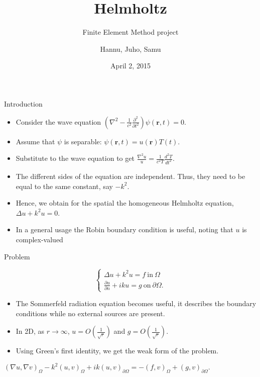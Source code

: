 \documentclass{beamer}
\title[Helmholtz]{Helmholtz}
\subtitle{Finite Element Method project}
\author{Hannu, Juho, Samu}
\date{April 2, 2015}
\begin{document}
\begin{frame}
\titlepage
\end{frame}

\begin{frame}{Introduction}
\begin{itemize}
\item Consider the wave equation $(\nabla^2 - \frac{1}{c^2} \frac{\partial^2}{\partial t^2})\psi(\mathbf{r}, t) = 0$. 
\item Assume that $\psi$ is separable: $\psi(\mathbf{r}, t) = u(\mathbf{r})T(t)$. 
\item Substitute to the wave equation to get $\frac{\nabla^2 u}{u} = \frac{1}{c^2 T} \frac{d^2 T}{dt^2}$. 
\item The different sides of the equation are independent. Thus, they need to be equal to the same constant, say $-k^2$.
\item Hence, we obtain for the spatial the homogeneous Helmholtz equation, $\Delta u + k^2 u = 0$.
\item In a general usage the Robin boundary condition is useful, noting that $u$ is complex-valued
\end{itemize}
\end{frame}


\begin{frame}{Problem}

\begin{definition}
\[ \begin{cases}
\Delta u + k^2 u = f \ \mathrm{in} \ \Omega \\ \frac{\partial u}{\partial n} + iku = g \ \mathrm{on} \ \partial \Omega.
\end{cases} \]
\end{definition}
\begin{itemize}
\item The Sommerfeld radiation equation becomes useful, it describes the boundary conditions while no external sources are present.
\item In 2D, as $r \rightarrow \infty$, $u = O(\frac{1}{\sqrt{r}})$ and $g = O(\frac{1}{\sqrt{r}})$. %
\item Using Green's first identity, we get the weak form of the problem.
\end{itemize}
\begin{definition}
$(\nabla u, \nabla v)_{\Omega} - k^2(u, v)_{\Omega} + ik(u, v)_{\partial \Omega} = -(f, v)_{\Omega} + (g, v)_{\partial \Omega}.$
\end{definition}
\end{frame}
\end{document}
